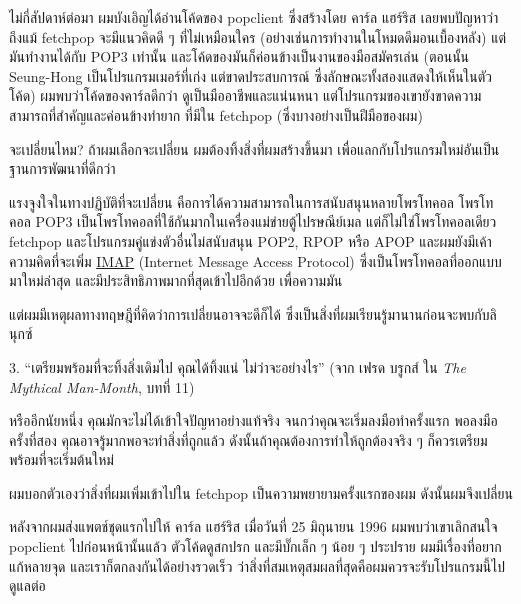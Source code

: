 ไม่กี่สัปดาห์ต่อมา ผมบังเอิญได้อ่านโค้ดของ popclient ซึ่งสร้างโดย คาร์ล
แฮร์ริส เลยพบปัญหาว่า ถึงแม้ fetchpop จะมีแนวคิดดี ๆ  ที่ไม่เหมือนใคร
(อย่างเช่นการทำงานในโหมดดีมอนเบื้องหลัง) แต่มันทำงานได้กับ POP3 เท่านั้น
และโค้ดของมันก็ค่อนข้างเป็นงานของมือสมัครเล่น (ตอนนั้น Seung-Hong
เป็นโปรแกรมเมอร์ที่เก่ง แต่ขาดประสบการณ์
ซึ่งลักษณะทั้งสองแสดงให้เห็นในตัวโค้ด) ผมพบว่าโค้ดของคาร์ลดีกว่า
ดูเป็นมืออาชีพและแน่นหนา
แต่โปรแกรมของเขายังขาดความสามารถที่สำคัญและค่อนข้างทำยาก ที่มีใน
fetchpop (ซึ่งบางอย่างเป็นฝีมือของผม)

จะเปลี่ยนไหม? ถ้าผมเลือกจะเปลี่ยน ผมต้องทิ้งสิ่งที่ผมสร้างขึ้นมา
เพื่อแลกกับโปรแกรมใหม่อันเป็นฐานการพัฒนาที่ดีกว่า

แรงจูงใจในทางปฏิบัติที่จะเปลี่ยน
คือการได้ความสามารถในการสนับสนุนหลายโพรโทคอล โพรโทคอล POP3
เป็นโพรโทคอลที่ใช้กันมากในเครื่องแม่ข่ายตู้ไปรษณีย์เมล
แต่ก็ไม่ใช่โพรโทคอลเดียว fetchpop และโปรแกรมคู่แข่งตัวอื่นไม่สนับสนุน
POP2, RPOP หรือ APOP และผมยังมีเค้าความคิดที่จะเพิ่ม
\href{http://www.imap.org}{IMAP} (Internet Message Access Protocol)
ซึ่งเป็นโพรโทคอลที่ออกแบบมาใหม่ล่าสุด
และมีประสิทธิภาพมากที่สุดเข้าไปอีกด้วย เพื่อความมัน

แต่ผมมีเหตุผลทางทฤษฎีที่คิดว่าการเปลี่ยนอาจจะดีก็ได้
ซึ่งเป็นสิ่งที่ผมเรียนรู้มานานก่อนจะพบกับลินุกซ์

\begin{fancyquotes}
  3. ``เตรียมพร้อมที่จะทิ้งสิ่งเดิมไป คุณได้ทิ้งแน่ ไม่ว่าจะอย่างไร'' (จาก
  เฟรด บรูกส์ ใน \emph{The Mythical Man-Month}, บทที่ 11)
\end{fancyquotes}

หรืออีกนัยหนึ่ง คุณมักจะไม่ได้เข้าใจปัญหาอย่างแท้จริง
จนกว่าคุณจะเริ่มลงมือทำครั้งแรก พอลงมือครั้งที่สอง
คุณอาจรู้มากพอจะทำสิ่งที่ถูกแล้ว ดังนั้นถ้าคุณต้องการทำให้ถูกต้องจริง ๆ
ก็ควรเตรียมพร้อมที่จะเริ่มต้นใหม่ 

ผมบอกตัวเองว่าสิ่งที่ผมเพิ่มเข้าไปใน fetchpop
เป็นความพยายามครั้งแรกของผม ดังนั้นผมจึงเปลี่ยน

หลังจากผมส่งแพตช์ชุดแรกไปให้ คาร์ล แฮร์ริส เมื่อวันที่ 25 มิถุนายน 1996
ผมพบว่าเขาเลิกสนใจ popclient ไปก่อนหน้านั้นแล้ว ตัวโค้ดดูสกปรก
และมีบั๊กเล็ก ๆ  น้อย ๆ  ประปราย ผมมีเรื่องที่อยากแก้หลายจุด
และเราก็ตกลงกันได้อย่างรวดเร็ว
ว่าสิ่งที่สมเหตุสมผลที่สุดคือผมควรจะรับโปรแกรมนี้ไปดูแลต่อ

